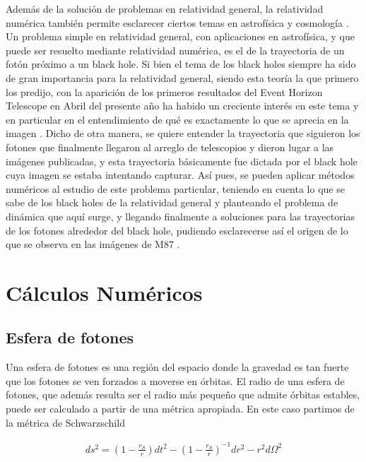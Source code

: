 \documentclass[%
 reprint,
 amsmath,amssymb,
 aps,
floatfix,
]{revtex4-1}
\begin{document}
Además de la solución de problemas en relatividad general, la relatividad numérica también permite esclarecer ciertos temas en astrofísica y cosmología \cite{Barack2019BlackRoadmap, Lehner2014NumericalAstrophysics, Seidel1999NumericalAstrophysics}. Un problema simple en relatividad general, con aplicaciones en astrofísica, y que puede ser resuelto mediante relatividad numérica, es el de la trayectoria de un fotón próximo a un black hole. Si bien el tema de los black holes siempre ha sido de gran importancia para la relatividad general, siendo esta teoría la que primero los predijo, con la aparición de los primeros resultados del Event Horizon Telescope en Abril del presente año \cite{Akiyama2019FirstHole, Akiyama2019FirstHoleb} ha habido un creciente interés en este tema y en particular en el entendimiento de qué es exactamente lo que se aprecia en la imagen \cite{Akiyama2019FirstRing}. Dicho de otra manera, se quiere entender la trayectoria que siguieron los fotones que finalmente llegaron al arreglo de telescopios y dieron lugar a las imágenes publicadas, y esta trayectoria básicamente fue dictada por el black hole cuya imagen se estaba intentando capturar.
Así pues, se pueden aplicar métodos numéricos al estudio de este problema particular, teniendo en cuenta lo que se sabe de los black holes de la relatividad general y planteando el problema de dinámica que aquí surge, y llegando finalmente a soluciones para las trayectorias de los fotones alrededor del black hole, pudiendo esclarecerse así el origen de lo que se observa en las imágenes de M87 \cite{Nolte2019OrbitingHole}.

\section{Cálculos Numéricos}

\subsection{Esfera de fotones}

Una esfera de fotones es una región del espacio donde la gravedad es tan fuerte que los fotones se ven forzados a moverse en órbitas. El radio de una esfera de fotones, que además resulta ser el radio más pequeño que admite órbitas estables, puede ser calculado a partir de una métrica apropiada. En este caso partimos de la métrica de Schwarzschild

\begin{align}
    ds^2 = \left(1 - \frac{r_S}{r}\right) dt^2 - \left(1 - \frac{r_S}{r}\right)^{-1} dr^2 - r^2 d\Omega^2
\end{align}
\end{document}
